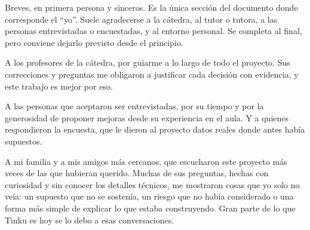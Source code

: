 
\begin{guia}
Breves, en primera persona y sinceros. Es la única sección del documento
donde corresponde el ``yo''. Suele agradecerse a la cátedra, al tutor o
tutora, a las personas entrevistadas o encuestadas, y al entorno personal.
Se completa al final, pero conviene dejarlo previsto desde el principio.
\end{guia}

A los profesores de la cátedra, por guiarme a lo largo de todo el
proyecto. Sus correcciones y preguntas me obligaron a justificar cada
decisión con evidencia, y este trabajo es mejor por eso.

A las personas que aceptaron ser entrevistadas, por su tiempo y por la
generosidad de proponer mejoras desde su experiencia en el aula. Y a
quienes respondieron la encuesta, que le dieron al proyecto datos reales
donde antes había supuestos.

A mi familia y a mis amigos más cercanos, que escucharon este proyecto
más veces de las que hubieran querido. Muchas de sus preguntas, hechas
con curiosidad y sin conocer los detalles técnicos, me mostraron cosas
que yo solo no veía: un supuesto que no se sostenía, un riesgo que no
había considerado o una forma más simple de explicar lo que estaba
construyendo. Gran parte de lo que Tinku es hoy se lo debo a esas
conversaciones.
